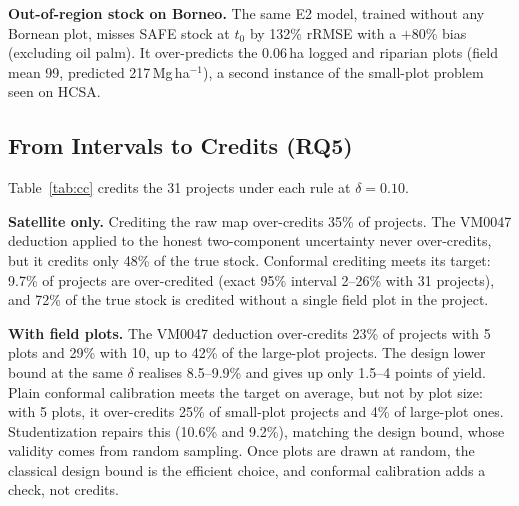 \documentclass[conference,a4paper]{IEEEtran}
\begin{document}
\textbf{Out-of-region stock on Borneo.} The same E2 model, trained without any Bornean plot, misses SAFE stock at $t_0$ by 132\% rRMSE with a $+80$\% bias (excluding oil palm). It over-predicts the 0.06\,ha logged and riparian plots (field mean 99, predicted 217\,Mg\,ha$^{-1}$), a second instance of the small-plot problem seen on HCSA.

\subsection{From Intervals to Credits (RQ5)}
\label{sec:ccresults}
Table~\ref{tab:cc} credits the 31 projects under each rule at $\delta=0.10$.

\textbf{Satellite only.} Crediting the raw map over-credits 35\% of projects. The VM0047 deduction applied to the honest two-component uncertainty never over-credits, but it credits only 48\% of the true stock. Conformal crediting meets its target: 9.7\% of projects are over-credited (exact 95\% interval 2--26\% with 31 projects), and 72\% of the true stock is credited without a single field plot in the project.

\textbf{With field plots.} The VM0047 deduction over-credits 23\% of projects with 5 plots and 29\% with 10, up to 42\% of the large-plot projects. The design lower bound at the same $\delta$ realises 8.5--9.9\% and gives up only 1.5--4 points of yield. Plain conformal calibration meets the target on average, but not by plot size: with 5 plots, it over-credits 25\% of small-plot projects and 4\% of large-plot ones. Studentization repairs this (10.6\% and 9.2\%), matching the design bound, whose validity comes from random sampling. Once plots are drawn at random, the classical design bound is the efficient choice, and conformal calibration adds a check, not credits.
\end{document}
